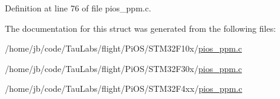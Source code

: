 \-Definition at line 76 of file pios\-\_\-ppm.\-c.



\-The documentation for this struct was generated from the following files\-:\begin{DoxyCompactItemize}
\item 
/home/jb/code/\-Tau\-Labs/flight/\-Pi\-O\-S/\-S\-T\-M32\-F10x/\hyperlink{_s_t_m32_f10x_2pios__ppm_8c}{pios\-\_\-ppm.\-c}\item 
/home/jb/code/\-Tau\-Labs/flight/\-Pi\-O\-S/\-S\-T\-M32\-F30x/\hyperlink{_s_t_m32_f30x_2pios__ppm_8c}{pios\-\_\-ppm.\-c}\item 
/home/jb/code/\-Tau\-Labs/flight/\-Pi\-O\-S/\-S\-T\-M32\-F4xx/\hyperlink{_s_t_m32_f4xx_2pios__ppm_8c}{pios\-\_\-ppm.\-c}\end{DoxyCompactItemize}

